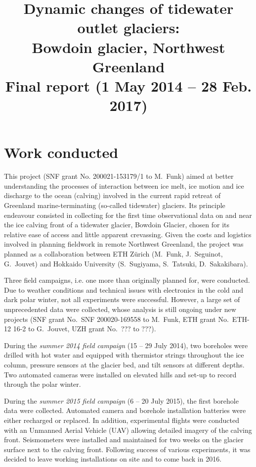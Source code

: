 \documentclass{article}
\title{Dynamic changes of tidewater outlet glaciers:\\
       Bowdoin glacier, Northwest Greenland\\\bigskip
       \large Final report (1 May 2014 -- 28 Feb. 2017)}
\author{}
\date{}
\begin{document}

\maketitle

\section{Work conducted}

This project (SNF grant No. 200021-153179/1 to M.~Funk) aimed at better
understanding the processes of interaction between ice melt, ice motion and ice
discharge to the ocean (calving) involved in the current rapid retreat of
Greenland marine-terminating (so-called tidewater) glaciers. Its principle
endeavour consisted in collecting for the first time observational data on and
near the ice calving front of a tidewater glacier, Bowdoin Glacier, chosen for
its relative ease of access and little apparent crevassing. Given the costs and
logistics involved in planning fieldwork in remote Northwest Greenland, the
project was planned as a collaboration between ETH Zürich (M.~Funk,
J.~Seguinot, G.~Jouvet) and Hokkaido University (S.~Sugiyama, S.~Tatsuki,
D.~Sakakibara).

Three field campaigns, i.e. one more than originally planned for, were
conducted. Due to weather conditions and technical issues with electronics in
the cold and dark polar winter, not all experiments were successful. However, a
large set of unprecedented data were collected, whose analysis is still ongoing
under new projects (SNF grant No.~SNF 200020-169558 to M.~Funk, ETH grant
No.~ETH-12 16-2 to G.~Jouvet, UZH grant No.~??? to ???).

During the \emph{summer 2014 field campaign} (15 -- 29 July 2014), two
boreholes were drilled with hot water and equipped with thermistor strings
throughout the ice column, pressure sensors at the glacier bed, and
tilt sensors at different depths. Two automated cameras were installed on
elevated hills and set-up to record through the polar winter.

During the \emph{summer 2015 field campaign} (6 -- 20 July 2015), the first
borehole data were collected. Automated camera and borehole installation
batteries were either recharged or replaced. In addition, experimental flights
were conducted with an Unmanned Aerial Vehicle (UAV) allowing detailed imagery
of the calving front. Seismometers were installed and maintained for two weeks
on the glacier surface next to the calving front. Following success of various
experiments, it was decided to leave working installations on site and to come
back in 2016.
\end{document}
